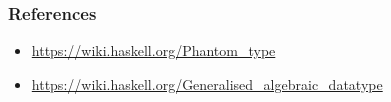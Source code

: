 \documentclass[aspectratio=43]{beamer}
\begin{document}
\begin{frame}[fragile]
 \frametitle{References}
 \begin{itemize}
  \item \url{https://wiki.haskell.org/Phantom_type}
  \item \url{https://wiki.haskell.org/Generalised_algebraic_datatype}
 \end{itemize}
\end{frame}






% 
% 
% 
% 
\end{document}
